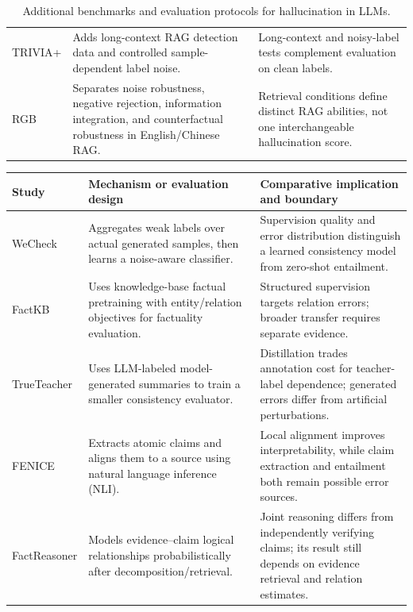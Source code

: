 \begin{table}[tp]
\begin{tabularx}{\textwidth}{@{}p{}p{}X@{}}
TRIVIA+ \citep{chen-etal-2026-rethinking-evaluation} & Adds long-context RAG detection data and controlled sample-dependent label noise. & Long-context and noisy-label tests complement evaluation on clean labels. \\
RGB \citep{extrgb2024} & Separates noise robustness, negative rejection, information integration, and counterfactual robustness in English/Chinese RAG. & Retrieval conditions define distinct RAG abilities, not one interchangeable hallucination score. \\
\bottomrule\end{tabularx}
\caption{Additional benchmarks and evaluation protocols for hallucination in LLMs.}
\label{tab:extra-evaluation}
\end{table}

\begin{table}[tp]
\centering\small\setlength{\tabcolsep}{5pt}\renewcommand{\arraystretch}{1.18}
\begin{tabularx}{\textwidth}{@{}p{}p{}X@{}}\toprule
Study & Mechanism or evaluation design & Comparative implication and boundary \\\midrule
WeCheck \citep{wu-etal-2023-wecheck} & Aggregates weak labels over actual generated samples, then learns a noise-aware classifier. & Supervision quality and error distribution distinguish a learned consistency model from zero-shot entailment. \\
FactKB \citep{feng-etal-2023-factkb} & Uses knowledge-base factual pretraining with entity/relation objectives for factuality evaluation. & Structured supervision targets relation errors; broader transfer requires separate evidence. \\
TrueTeacher \citep{gekhman-etal-2023-trueteacher} & Uses LLM-labeled model-generated summaries to train a smaller consistency evaluator. & Distillation trades annotation cost for teacher-label dependence; generated errors differ from artificial perturbations. \\
FENICE \citep{scire-etal-2024-fenice} & Extracts atomic claims and aligns them to a source using natural language inference (NLI). & Local alignment improves interpretability, while claim extraction and entailment both remain possible error sources. \\
FactReasoner \citep{marinescu-etal-2025-factreasoner} & Models evidence--claim logical relationships probabilistically after decomposition/retrieval. & Joint reasoning differs from independently verifying claims; its result still depends on evidence retrieval and relation estimates. \\

\end{tabularx}
\end{table}
